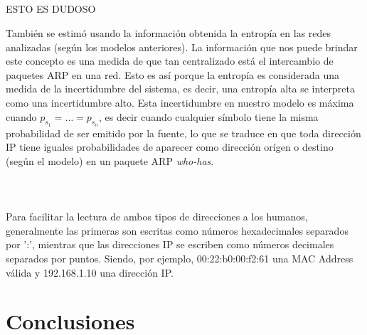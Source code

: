 \\ \\ \\ \\ 
ESTO ES DUDOSO
\par También se estimó usando la información obtenida la entropía en las redes analizadas (según los modelos anteriores). La información que nos puede brindar este concepto es una medida de que tan centralizado está el intercambio de paquetes ARP en una red. Esto es así porque la entropía es considerada una medida de la incertidumbre del sistema, es decir, una entropía alta se interpreta como una incertidumbre alto. Esta incertidumbre en nuestro modelo es máxima cuando $p_{s_1} = \dots = p_{s_n}$, es decir cuando cualquier símbolo tiene la misma probabilidad de ser emitido por la fuente, lo que se traduce en que toda dirección IP tiene iguales probabilidades de aparecer como dirección orígen o destino (según el modelo) en un paquete ARP \textit{who-has}.
\\ \\ \\ \\
 

Para facilitar la lectura de ambos tipos de direcciones a los humanos, generalmente las primeras son escritas como números hexadecimales separados por ':', mientras que las direcciones IP se escriben como números decimales separados por puntos. Siendo, por ejemplo, 00:22:b0:00:f2:61 una MAC Address válida y 192.168.1.10 una dirección IP.

\section{Conclusiones}


